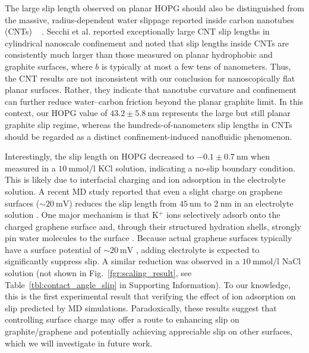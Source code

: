 \documentclass[journal=jacsat,manuscript=article]{achemso}
\providecommand{\DIFadd}[1]{{\protect\color{blue}#1}} %
\providecommand{\DIFaddend}{} %
\DeclareRobustCommand{\DIFaddend}{\DIFOaddend \let\includegraphics\DIFOincludegraphics} %
\begin{document}
\DIFadd{The large slip length observed on planar HOPG should also be distinguished from the massive, radius-dependent water slippage reported inside carbon nanotubes (CNTs) \mbox{%
\cite{Secchi2016-ks}}\hskip0pt%
. Secchi et al. reported exceptionally large CNT slip lengths in cylindrical nanoscale confinement and noted that slip lengths inside CNTs are consistently much larger than those measured on planar hydrophobic and graphite surfaces, where \(b\) is typically at most a few tens of nanometers. Thus, the CNT results are not inconsistent with our conclusion for nanoscopically flat planar surfaces. Rather, they indicate that nanotube curvature and confinement can further reduce water--carbon friction beyond the planar graphite limit. In this context, our HOPG value of \(43.2 \pm \SI{5.8}{\nano\metre}\) represents the large but still planar graphite slip regime, whereas the hundreds-of-nanometers slip lengths in CNTs should be regarded as a distinct confinement-induced nanofluidic phenomenon}\DIFaddend .

Interestingly, the slip length on HOPG decreased to \(-0.1 \pm \SI{0.7}{\nano\metre}\) when measured in a \(\SI{10}{\milli\mole\per\litre}\) KCl solution, indicating a no-slip boundary condition. This is likely due to interfacial charging and ion adsorption in the electrolyte solution. A recent MD study reported that even a slight charge on graphene surfaces (\(\sim\SI{20}{\milli\volt}\)) reduces the slip length from \(\SI{45}{\nano\metre}\) to \(\SI{2}{\nano\metre}\) in an electrolyte solution \cite{Xie2020-as}. One major mechanism is that K\(^+\) ions selectively adsorb onto the charged graphene surface and, through their structured hydration shells, strongly pin water molecules to the surface \cite{Mu2021-wm}. Because actual graphene surfaces typically have a surface potential of \(\sim\SI{20}{\milli\volt}\) \cite{Paruchuri2004-iu}, adding electrolyte is expected to significantly suppress slip. A similar reduction was observed in a \(\SI{10}{\milli\mole\per\litre}\) NaCl solution (not shown in Fig.~\ref{fgr:scaling_result}, see Table~\ref{tbl:contact_angle_slip} in Supporting Information). To our knowledge, this is the first experimental result that verifying the effect of ion adsorption on slip predicted by MD simulations. Paradoxically, these results suggest that controlling surface charge may offer a route to enhancing slip on graphite/graphene and potentially achieving appreciable slip on other surfaces, which we will investigate in future work.
\end{document}
